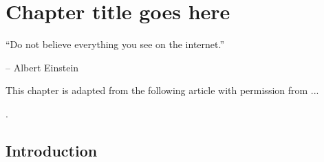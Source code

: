 \chapter{Chapter title goes here} \label{chap:chap-2}

\epigraph{\enquote{Do not believe everything you see on the internet.}}{-- Albert Einstein}



\begin{singlespace}         %
    This chapter is adapted from the following article with permission from ...
    
    . 
\end{singlespace} 


\section{Introduction}
\Blindtext[2]
